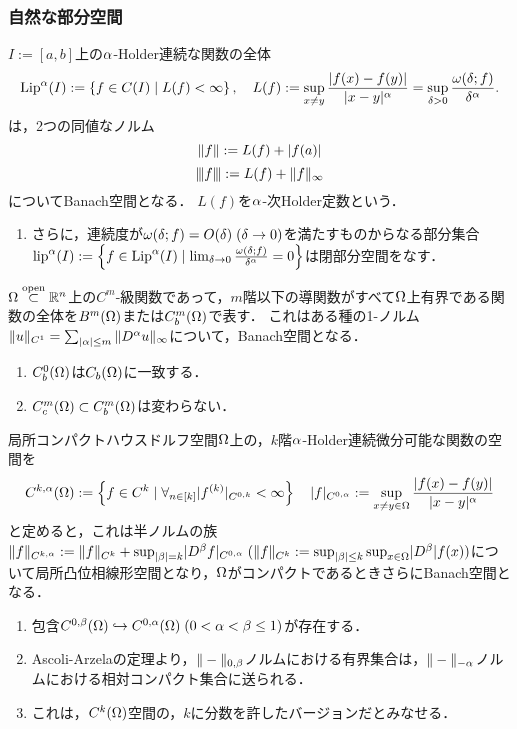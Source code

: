 \documentclass[uplatex,dvipdfmx]{jsreport}
\begin{document}
\subsubsection{自然な部分空間}

\begin{example}[Lipschitz空間]
    $I:=[a,b]$上の$\alpha$-Holder連続な関数の全体
    \[\mathrm{Lip}^\alpha(I):=\left\{f\in C(I)\mid L(f)<\infty\right\},\quad L(f):=\sup_{x\ne y}\frac{\lvert f(x)-f(y)\rvert}{\lvert x-y\rvert^\alpha}=\sup_{\delta>0}\frac{\omega(\delta;f)}{\delta^\alpha}.\]
    は，2つの同値なノルム
    \[\|f\|:=L(f)+\lvert f(a)\rvert\]
    \[{\left\vert\kern-0.25ex\left\vert\kern-0.25ex\left\vert f \right\vert\kern-0.25ex\right\vert\kern-0.25ex\right\vert}:=L(f)+\|f\|_\infty\]
    についてBanach空間となる．
    $L(f)$を$\alpha$-次Holder定数という．
    \begin{enumerate}
        \item さらに，連続度が$\omega(\delta;f)=O(\delta)\;(\delta\to0)$を満たすものからなる部分集合$\textrm{lip}^\alpha(I):=\left\{f\in\mathrm{Lip}^\alpha(I)\mid\lim_{\delta\to0}\frac{\omega(\delta;f)}{\delta^\alpha}=0\right\}$は閉部分空間をなす．
    \end{enumerate}
\end{example}

\begin{example}[導関数ノルムを備えたBanach空間]\label{exp-Banach-space-with-derivative-norm}
    $\Omega\overset{\mathrm{open}}{\subset}\mathbb{R}^n$上の$C^m$-級関数であって，$m$階以下の導関数がすべて$\Omega$上有界である関数の全体を$B^m(\Omega)$または$C_b^m(\Omega)$で表す．
    これはある種の1-ノルム$\|u\|_{C^1}=\sum_{\lvert\alpha\rvert\le m}\|D^\alpha u\|_\infty$について，Banach空間となる．
    \begin{enumerate}
        \item $C_b^0(\Omega)$は$C_b(\Omega)$に一致する．
        \item $C_c^m(\Omega)\subset C_b^m(\Omega)$は変わらない．
    \end{enumerate}
\end{example}

\begin{example}[Holder空間]
    局所コンパクトハウスドルフ空間$\Omega$上の，$k$階$\alpha$-Holder連続微分可能な関数の空間を
    \[C^{k,\alpha}(\Omega):=\left\{f\in C^k\mid\forall_{n\in[k]}\lvert f^{(k)}\rvert_{C^{0,k}}<\infty\right\}\quad\lvert f\rvert_{C^{0,\alpha}}:=\sup_{x\ne y\in\Omega}\frac{\lvert f(x)-f(y)\rvert}{\lvert x-y\rvert^\alpha}\]
    と定めると，これは半ノルムの族$\|f\|_{C^{k,\alpha}}:=\|f\|_{C^k}+\sup_{\lvert\beta\rvert=k}\lvert D^\beta f\rvert_{C^{0,\alpha}}\;(\|f\|_{C^k}:=\sup_{\lvert\beta\rvert\le k}\sup_{x\in\Omega}\lvert D^\beta\rvert f(x))$について局所凸位相線形空間となり，$\Omega$がコンパクトであるときさらにBanach空間となる．
    \begin{enumerate}
        \item 包含$C^{0,\beta}(\Omega)\hookrightarrow C^{0,\alpha}(\Omega)\;(0<\alpha<\beta\le 1)$が存在する．
        \item Ascoli-Arzelaの定理より，$\|-\|_{0,\beta}$ノルムにおける有界集合は，$\|-\|_{-\alpha}$ノルムにおける相対コンパクト集合に送られる．
        \item これは，$C^k(\Omega)$空間の，$k$に分数を許したバージョンだとみなせる．
    \end{enumerate}
\end{example}
\end{document}
